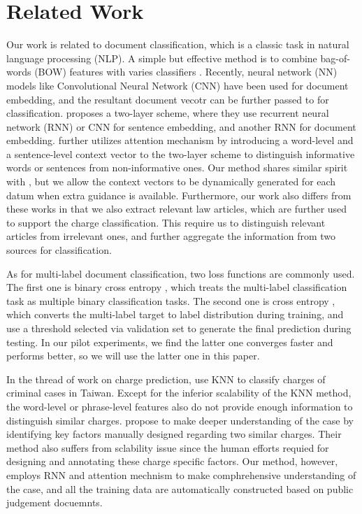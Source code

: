 \section{Related Work}
\label{sec_related_work}
Our work is related to document classification, which is a classic task in natural language processing (NLP). A simple but effective method is to combine bag-of-words (BOW) features with varies classifiers \cite{joachims1998text}. 
Recently, neural network (NN) models like Convolutional Neural Network (CNN) \cite{kim2014convolutional} have been used for document embedding, and the resultant document vecotr can be further passed to  for classification.
\cite{tang2015document} proposes a two-layer scheme, where they use recurrent neural network (RNN) or CNN for sentence embedding, and another RNN for document embedding. 
\cite{yang2016hierarchical} further utilizes attention mechanism by introducing a word-level and a sentence-level context vector to the two-layer scheme to distinguish informative words or sentences from non-informative ones. 
Our method shares similar spirit with \cite{yang2016hierarchical}, but we allow the context vectors to be dynamically generated for each datum when extra guidance is available.
Furthermore, our work also differs from these works in that we also extract relevant law articles, which are further used to support the charge classification. This require us to distinguish relevant articles from irrelevant ones, and further aggregate the information from two sources for classification.

As for multi-label document classification, two loss functions are commonly used. 
The first one is binary cross entropy \cite{nam2014large}, which treats the multi-label classification task as multiple binary classification tasks. 
The second one is cross entropy \cite{kurata2016improved}, which converts the multi-label target to label distribution during training, and use a threshold selected via validation set to generate the final prediction during testing. In our pilot experiments, we find the latter one converges faster and performs better, so we will use the latter one in this paper.


In the thread of work on charge prediction, \cite{LIU2004case,liu2006exploring} use KNN to classify charges of criminal cases in Taiwan. Except for the inferior scalability of the KNN method, the word-level or phrase-level features also do not provide enough information to distinguish similar charges. \cite{lin2012exploiting} propose to make deeper understanding of the case by identifying key factors manually designed regarding two similar charges. Their method also suffers from sclability issue since the human efforts requied for designing and annotating these charge specific factors. Our method, however, employs RNN and attention mechnism to make comphrehensive understanding of the case, and all the training data are automatically constructed based on public judgement docuemnts. 

